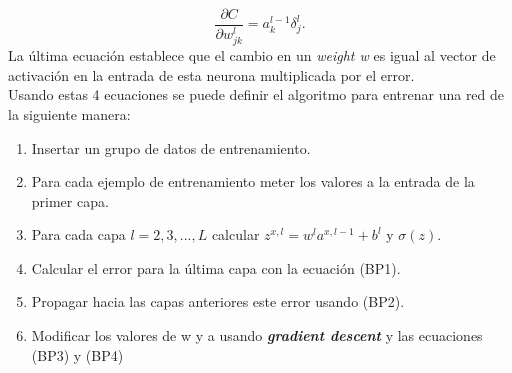 \documentclass[12pt,spanish]{article}
\begin{document}
	\[ \frac{\partial C}{\partial w^l_{jk}} = a^{l-1}_k \delta^l_j.	\tag{BP4} \]
	La última ecuación establece que el cambio en un \textit{weight w} es igual al vector de activación en la entrada de esta neurona multiplicada por el error.\\
	Usando estas 4 ecuaciones se puede definir el algoritmo para entrenar una red de la siguiente manera:
	\begin{enumerate}
		\item Insertar un grupo de datos de entrenamiento.
		\item Para cada ejemplo de entrenamiento meter los valores a la entrada de la primer capa.
		\item Para cada capa $l=2,3,...,L$ calcular $z^{x,l} = w^l a^{x,l-1}+b^l$ y $\sigma(z)$.
		\item Calcular el error para la última capa con la ecuación (BP1).
		\item Propagar hacia las capas anteriores este error usando (BP2).
		\item Modificar los valores de w y a usando \textbf{\textit{gradient descent}} y las ecuaciones (BP3) y (BP4)
	\end{enumerate}
\end{document}
